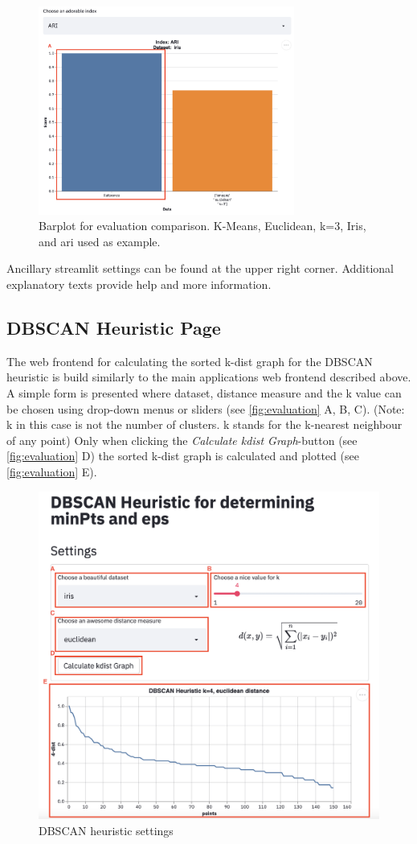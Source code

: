 \begin{figure}[H]
	\centering
	\includegraphics[width=0.75\textwidth]{modules/web_frontend/eval_bar.png}
	\caption{Barplot for evaluation comparison. K-Means, Euclidean, k=3, Iris, and \acrshort{ari} used as example.}\label{fig:eval_bar}
\end{figure}

Ancillary streamlit settings can be found at the upper right corner. Additional explanatory texts provide help and more information. \\


\subsection{DBSCAN Heuristic Page} \label{heuristicmanual}
The web frontend for calculating the sorted k-dist graph for the DBSCAN heuristic is build similarly to the main applications web frontend described above.
A simple form is presented where dataset, distance measure and the k value can be chosen using drop-down menus or sliders (see \autoref{fig:evaluation} A, B, C). (Note: k in this case is not the number of clusters. k stands for the k-nearest neighbour of any point)
Only when clicking the \textit{Calculate kdist Graph}-button (see \autoref{fig:evaluation} D) the sorted k-dist graph is calculated and plotted (see \autoref{fig:evaluation} E).

\begin{figure}[H]
	\centering
	\includegraphics[width=\linewidth]{modules/web_frontend/dbscan_heuristic.png}
	\caption{DBSCAN heuristic settings}\label{fig:heuristicfrontend}
\end{figure}
